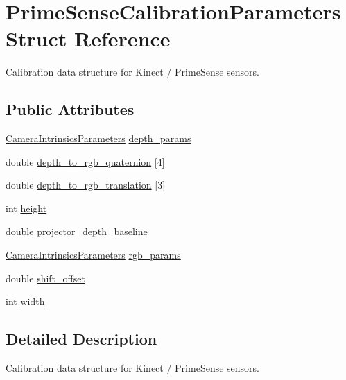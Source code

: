 \hypertarget{structfovis_1_1PrimeSenseCalibrationParameters}{
\section{PrimeSenseCalibrationParameters Struct Reference}
\label{structfovis_1_1PrimeSenseCalibrationParameters}
}


Calibration data structure for Kinect / PrimeSense sensors.  


\subsection*{Public Attributes}
\begin{DoxyCompactItemize}
\item 
\hyperlink{structfovis_1_1CameraIntrinsicsParameters}{CameraIntrinsicsParameters} \hyperlink{structfovis_1_1PrimeSenseCalibrationParameters_a02b8ac0eb76a582c54d1dd513d4ffb67}{depth\_\-params}
\item 
double \hyperlink{structfovis_1_1PrimeSenseCalibrationParameters_ae08cad90e6099b8284b8effd7a49e0d0}{depth\_\-to\_\-rgb\_\-quaternion} \mbox{[}4\mbox{]}
\item 
double \hyperlink{structfovis_1_1PrimeSenseCalibrationParameters_a239f2048204d50d626815962621abe00}{depth\_\-to\_\-rgb\_\-translation} \mbox{[}3\mbox{]}
\item 
int \hyperlink{structfovis_1_1PrimeSenseCalibrationParameters_ad12fc34ce789bce6c8a05d8a17138534}{height}
\item 
double \hyperlink{structfovis_1_1PrimeSenseCalibrationParameters_a7b21a23b56773fa0934aed19659d091a}{projector\_\-depth\_\-baseline}
\item 
\hyperlink{structfovis_1_1CameraIntrinsicsParameters}{CameraIntrinsicsParameters} \hyperlink{structfovis_1_1PrimeSenseCalibrationParameters_a7c3992201264ae4b695547368383fc1d}{rgb\_\-params}
\item 
double \hyperlink{structfovis_1_1PrimeSenseCalibrationParameters_a3fafda545ad2c75f65a393e9312fa874}{shift\_\-offset}
\item 
int \hyperlink{structfovis_1_1PrimeSenseCalibrationParameters_a2474a5474cbff19523a51eb1de01cda4}{width}
\end{DoxyCompactItemize}


\subsection{Detailed Description}
Calibration data structure for Kinect / PrimeSense sensors. 

